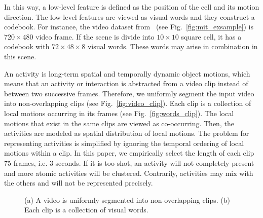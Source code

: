 In this way, a low-level feature is defined as the position of the cell and its motion direction. 
The low-level features are viewed as visual words and they construct a codebook.
For instance, the video dataset from~\cite{wang2009unsupervised} (see Fig.~\ref{fig:mit_exsample}) is $720\times 480$ video frame. If the scene is divide into $10\times10$ square cell, it has a codebook with $72\times48\times8$ visual words. These words may arise in combination in this scene.

An activity is long-term spatial and temporally dynamic object motions, which means that an activity or interaction is abstracted from a video clip instead of between two successive frames.
Therefore, we uniformly segment the input video into non-overlapping clips (see Fig.~\ref{fig:video_clip}). 
Each clip is a collection of local motions occurring in its frames (see Fig.~\ref{fig:words_clip}). 
The local motions that exist in the same clips are viewed as co-occurring. 
Then, the activities are modeled as spatial distribution of local motions.
The problem for representing activities is simplified by ignoring the temporal ordering of local motions within a clip.
In this paper, we empirically select the length of each clip 75 frames, i.e. 3 seconds. If it is too shot, an activity will not completely present and more atomic activities will be clustered. Contrarily, activities may mix with the others and will not be represented precisely.

\begin{figure}[!htbp]
	\centering
	\hspace{2cm}
	\caption[Video clip ]
	{(a) A video is uniformly segmented into non-overlapping clips. (b) Each clip is a collection of visual words. }
\end{figure}

